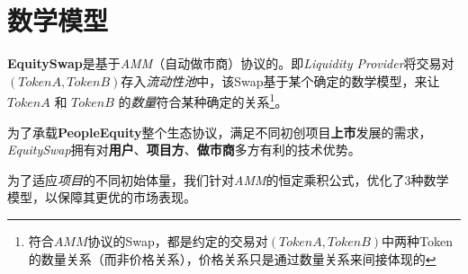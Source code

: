\documentclass{article}
\begin{document}



\section{数学模型}

\textbf{EquitySwap}是基于\emph{AMM}（自动做市商）协议的。即\emph{Liquidity Provider}将交易对$(TokenA, TokenB)$存入\emph{流动性池}中，该Swap基于某个确定的数学模型，来让 $TokenA$ 和 $TokenB$ 的\emph{数量}符合某种确定的关系\footnote{符合$AMM$协议的Swap，都是约定的交易对$(TokenA, TokenB)$中两种Token的数量关系（而非价格关系），价格关系只是通过数量关系来间接体现的}。

为了承载\textbf{PeopleEquity}整个生态协议，满足不同初创项目\textbf{上市}发展的需求，\emph{EquitySwap}拥有对\textbf{用户}、\textbf{项目方}、\textbf{做市商}多方有利的技术优势。

为了适应\emph{项目}的不同初始体量，我们针对\emph{AMM}的恒定乘积公式，优化了3种数学模型，以保障其更优的市场表现。
\end{document}
